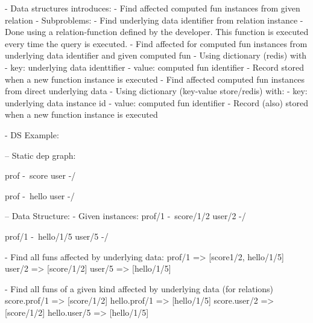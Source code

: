 - Data structures introduces:
  - Find affected computed fun instances from given relation
    - Subproblems:
      - Find underlying data identifier from relation instance
        - Done using a relation-function defined by the developer. This
          function is executed every time the query is executed.
      - Find affected for computed fun instances from underlying data identifier and given computed fun
        - Using dictionary (redis) with
          - key: underlying data identtifier
          - value: computed fun identifier
        - Record stored when a new function instance is executed
  - Find affected computed fun instances from direct underlying data
    - Using dictionary (key-value store/redis) with:
      - key: underlying data instance id
      - value: computed fun identifier
    - Record (also) stored when a new function instance is executed

- DS Example:

-- Static dep graph:

prof -\
       score
user -/

prof -\
       hello
user -/

-- Data Structure:
- Given instances:
prof/1 -\
         score/1/2
user/2 -/

prof/1 -\
         hello/1/5
user/5 -/

- Find all funs affected by underlying data:
prof/1 => [score1/2, hello/1/5]
user/2 => [score/1/2]
user/5 => [hello/1/5]

- Find all funs of a given kind affected by underlying data (for relations)
score.prof/1 => [score/1/2]
hello.prof/1 => [hello/1/5]
score.user/2 => [score/1/2]
hello.user/5 => [hello/1/5]


